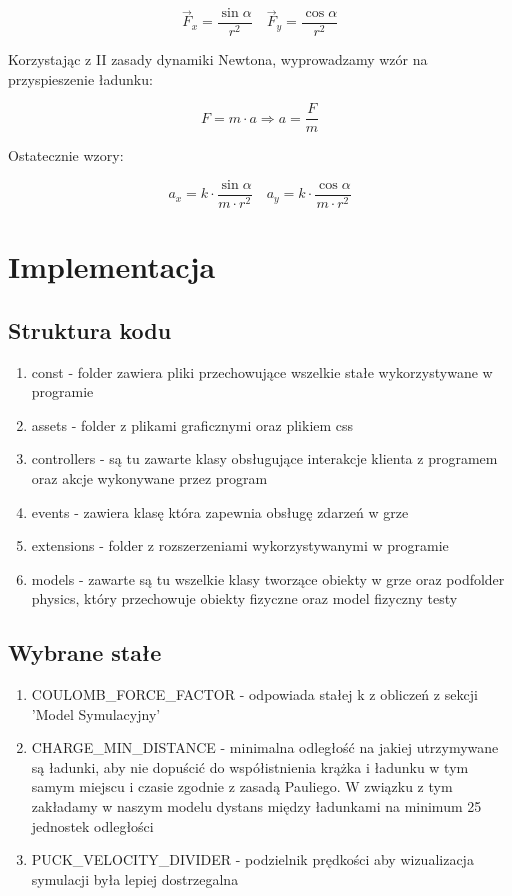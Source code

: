 \documentclass{article}
\begin{document}
$$
\vec{F}_{x}=\frac{\sin \alpha}{r^{2}} \quad \vec{F}_{y}=\frac{\cos \alpha}{r^{2}}
$$

\noindent Korzystając z II zasady dynamiki Newtona, wyprowadzamy wzór na przyspieszenie ładunku:

$$
F=m \cdot a \Rightarrow a=\frac{F}{m}
$$

\noindent Ostatecznie wzory:

$$
a_{x}=k \cdot \frac{\sin \alpha}{m \cdot r^{2}} \quad a_{y}=k \cdot \frac{\cos \alpha}{m \cdot r^{2}}
$$


\section{Implementacja}
\subsection{Struktura kodu}
\begin{enumerate}
    \item const - folder zawiera pliki przechowujące wszelkie stałe wykorzystywane w programie
    \item assets - folder z plikami graficznymi oraz plikiem css
    \item controllers - są tu zawarte klasy obsługujące interakcje klienta z programem oraz akcje wykonywane przez program
    \item events - zawiera klasę która zapewnia obsługę zdarzeń w grze
    \item extensions - folder z rozszerzeniami wykorzystywanymi w programie
    \item models - zawarte są tu wszelkie klasy tworzące obiekty w grze oraz podfolder physics, który przechowuje obiekty fizyczne oraz model fizyczny
    \test testy
\end{enumerate}
\subsection{Wybrane stałe}
\begin{enumerate}
    \item COULOMB\_FORCE\_FACTOR - odpowiada stałej k z obliczeń z sekcji 'Model Symulacyjny'
    \item CHARGE\_MIN\_DISTANCE - minimalna odległość na jakiej utrzymywane są ładunki, aby nie dopuścić do współistnienia krążka i ładunku w tym samym miejscu i czasie zgodnie z zasadą Pauliego. W związku z tym zakładamy w naszym modelu dystans między ładunkami na minimum 25 jednostek odległości
    \item PUCK\_VELOCITY\_DIVIDER - podzielnik prędkości aby wizualizacja symulacji była lepiej dostrzegalna
\end{enumerate}
\end{document}
